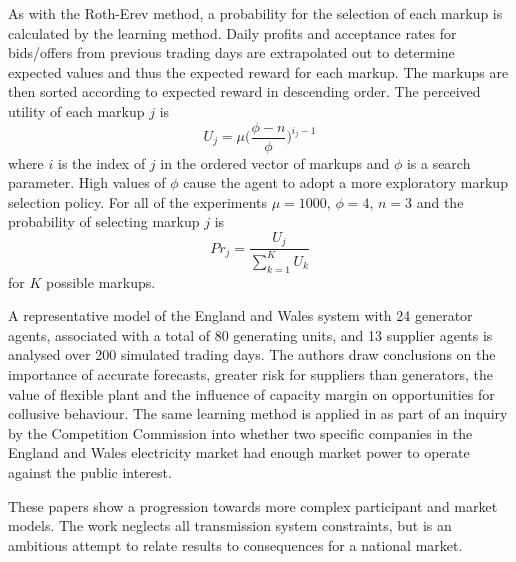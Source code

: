 As with the Roth-Erev method, a probability for the selection of each markup is
calculated by the learning method.  Daily profits and acceptance rates for
bids/offers from previous trading days are extrapolated out to determine
expected values and thus the expected reward for each markup.  The markups are
then sorted according to expected reward in descending order.  The perceived
utility of each markup $j$ is
\begin{equation}
U_j = \mu \biggl(\frac{\phi - n}{\phi}\biggr)^{i_j-1}
\end{equation}
where $i$ is the index of $j$ in the ordered vector of markups and $\phi$ is a
search parameter.  High values of $\phi$ cause the agent to adopt a more
exploratory markup selection policy.  For all of the experiments $\mu = 1000$,
$\phi = 4$, $n = 3$ and the probability of selecting markup $j$ is
\begin{equation}
Pr_j = \frac{U_j}{\sum_{k=1}^K U_k}
\end{equation}
for $K$ possible markups.

A representative model of the England and Wales system with 24 generator agents,
associated with a total of 80 generating units, and 13 supplier agents is
analysed over 200 simulated trading days.  The authors draw conclusions on the
importance of accurate forecasts, greater risk for suppliers than generators,
the value of flexible plant and the influence of capacity margin on
opportunities for collusive behaviour. The same learning method is applied in
 as part of an inquiry by the Competition Commission into whether
two specific companies in the England and Wales electricity market had enough
market power to operate against the public interest.

These papers show a progression towards more complex participant and market
models.  The work neglects all transmission system constraints, but is an
ambitious attempt to relate results to consequences for a national market.

